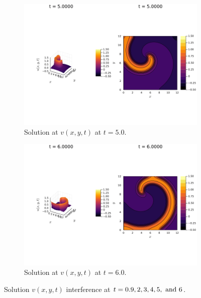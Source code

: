 \documentclass[12pt]{report}
\begin{document}
\begin{solution}
\begin{figure}[H]
\begin{subfigure}[b]{0.45\linewidth}
        \includegraphics[width=\linewidth]{images/6-2-500.png}
        \caption{Solution at $v(x,y,t)$ at $t=5.0$.}
        \label{6-2:e}
        \vspace{4ex}
    \end{subfigure}%
    \begin{subfigure}[b]{0.45\linewidth}
        \centering
        \includegraphics[width=\linewidth]{images/6-2-600.png}
        \caption{Solution at $v(x,y,t)$ at $t=6.0$.}
        \label{6-2:f}
        \vspace{4ex}
    \end{subfigure}
    \caption{Solution $v(x,y,t)$ interference at $t=0.9,2,3,4,5,{~\text{and}~} 6$. }
    \label{6-2}
\end{figure}

\end{solution}

\newpage
\end{document}
